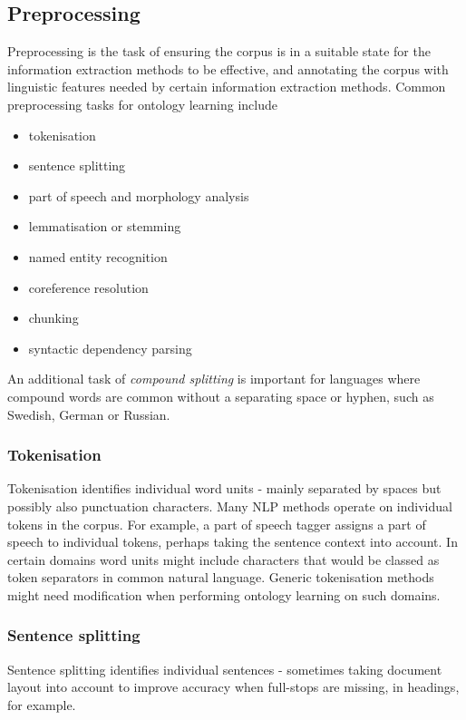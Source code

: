 \documentclass[a4paper]{report}
\begin{document}
\subsection{Preprocessing}
\label{sec:lit-rev:preproc}

Preprocessing is the task of ensuring the corpus is in a suitable state for the information extraction methods to be effective, and annotating the corpus with linguistic features needed by certain information extraction methods.
Common preprocessing tasks for ontology learning include
\begin{itemize}
  \item tokenisation
  \item sentence splitting
  \item part of speech and morphology analysis
  \item lemmatisation or stemming
  \item named entity recognition
  \item coreference resolution
  \item chunking
  \item syntactic dependency parsing
\end{itemize}
An additional task of \emph{compound splitting} is important for languages where compound words are common without a separating space or hyphen, such as Swedish, German or Russian.

\subsubsection{Tokenisation}

Tokenisation identifies individual word units - mainly separated by spaces but possibly also punctuation characters.
Many NLP methods operate on individual tokens in the corpus.
For example, a part of speech tagger assigns a part of speech to individual tokens, perhaps taking the sentence context into account.
In certain domains word units might include characters that would be classed as token separators in common natural language.
Generic tokenisation methods might need modification when performing ontology learning on such domains.

\subsubsection{Sentence splitting}

Sentence splitting identifies individual sentences - sometimes taking document layout into account to improve accuracy when full-stops are missing, in headings, for example.
\end{document}

